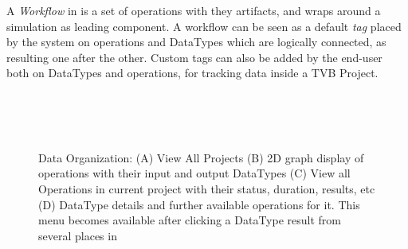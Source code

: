 A \emph{Workflow} in \TVB is a set of operations with they artifacts, and wraps around a simulation as leading component.
A workflow can be seen as a default \emph{tag} placed by the system on operations and DataTypes 
which are logically connected, as resulting one after the other.
Custom tags can also be added by the end-user both on DataTypes and operations, for tracking data inside a TVB Project.
	
 \begin{figure}[!htbp]
 	\centering
	\\
	\\
	\\
	\caption{\TVB Data Organization: 
	(A) View All Projects
	(B) 2D graph display of operations with their input and output DataTypes 
	(C) View all Operations in current project with their status, duration, results, etc
	(D) DataType details and further available operations for it. This menu becomes available after clicking a DataType result from several places in \TVB }
        \label{fig:project}
\end{figure}

